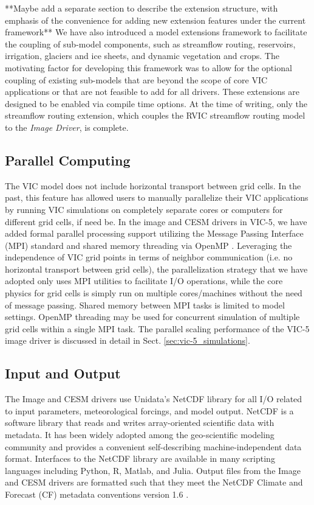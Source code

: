 \documentclass[gmd, manuscript]{copernicus}
\begin{document}
  **Maybe add a separate section to describe the extension structure, with emphasis of the convenience for adding new extension features under the current framework**
  We have also introduced a model extensions framework to facilitate the coupling of sub-model components, such as streamflow routing, reservoirs, irrigation, glaciers and ice sheets, and dynamic vegetation and crops. The motivating factor for developing this framework was to allow for the optional coupling of existing sub-models that are beyond the scope of core VIC applications or that are not feasible to add for all drivers. These extensions are designed to be enabled via compile time options. At the time of writing, only the streamflow routing extension, which couples the RVIC streamflow routing model \citep{Hamman_2017a} to the \textit{Image Driver}, is complete.

  \subsection{Parallel Computing}
    \label{sec:parallel}
    The VIC model does not include horizontal transport between grid cells. In the past, this feature has allowed users to manually parallelize their VIC applications by running VIC simulations on completely separate cores or computers for different grid cells, if need be. In the image and CESM drivers in VIC-5, we have added formal parallel processing support utilizing the Message Passing Interface (MPI) standard \citep{Gropp_1996} and shared memory threading via OpenMP \citep{Dagum_1998}. Leveraging the independence of VIC grid points in terms of neighbor communication (i.e. no horizontal transport between grid cells), the parallelization strategy that we have adopted only uses MPI utilities to facilitate I/O operations, while the core physics for grid cells is simply run on multiple cores/machines without the need of message passing. Shared memory between MPI tasks is limited to model settings. OpenMP threading may be used for concurrent simulation of multiple grid cells within a single MPI task. The parallel scaling performance of the VIC-5 image driver is discussed in detail in Sect. \ref{sec:vic-5_simulations}.

  \subsection{Input and Output}
    \label{sec:io}
    The Image and CESM drivers use Unidata's NetCDF library \citep{Rew_1990} for all I/O related to input parameters, meteorological forcings, and model output. NetCDF is a software library that reads and writes array-oriented scientific data with metadata. It has been widely adopted among the geo-scientific modeling community and provides a convenient self-describing machine-independent data format. Interfaces to the NetCDF library are available in many scripting languages including Python, R, Matlab, and Julia. Output files from the Image and CESM drivers are formatted such that they meet the NetCDF Climate and Forecast (CF) metadata conventions version 1.6 \citep{Eaton_2003}.
\end{document}
